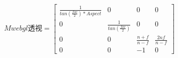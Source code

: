 $$
Mwebgl透视=
\begin{bmatrix}
  \frac{1}{tan(\frac{fov}{2}) * Aspect} & 0 & 0 & 0 \\
  0 & \frac{1}{tan(\frac{fov}{2})} & 0 & 0 \\
  0 & 0 & \frac{n + f}{n-f} & \frac{2nf}{n-f} \\
  0 & 0 & -1 & 0
\end{bmatrix}
$$